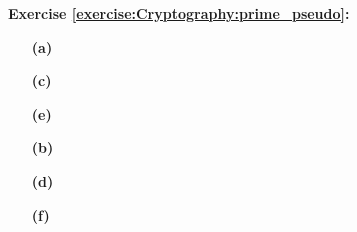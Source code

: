 
\noindent\textbf{Exercise \ref{exercise:Cryptography:prime_pseudo}:}
%  
% 
\begin{itemize}
 
 \item[{\bf (a)}]
 
 \item[{\bf (c)}]
 
 \item[{\bf (e)}]
 
\end{itemize}
\begin{itemize}
 
 \item[{\bf (b)}]
 
 \item[{\bf (d)}]
 
 \item[{\bf (f)}]
 
\end{itemize}
% 

